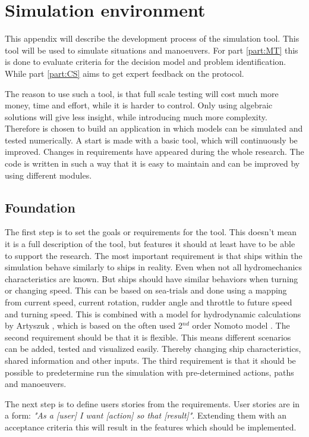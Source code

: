 \chapter{Simulation environment}
\label{app:tool}
This appendix will describe the development process of the simulation tool. This tool will be used to simulate situations and manoeuvers. For part \ref{part:MT} this is done to evaluate criteria for the decision model and problem identification. While part \ref{part:CS} aims to get expert feedback on the protocol.

The reason to use such a tool, is that full scale testing will cost much more money, time and effort, while it is harder to control. Only using algebraic solutions will give less insight, while introducing much more complexity. Therefore is chosen to build an application in which models can be simulated and tested numerically.
A start is made with a basic tool, which will continuously be improved. Changes in requirements have appeared during the whole research. The code is written in such a way that it is easy to maintain and can be improved by using different modules.

\section{Foundation}
The first step is to set the goals or requirements for the tool. This doesn't mean it is a full description of the tool, but features it should at least have to be able to support the research.
The most important requirement is that ships within the simulation behave similarly to ships in reality. Even when not all hydromechanics characteristics are known. But ships should have similar behaviors when turning or changing speed. This can be based on sea-trials and done using a mapping from current speed, current rotation, rudder angle and throttle to future speed and turning speed. This is combined with a model for hydrodynamic calculations by Artyszuk \cite{Artyszuk2016}, which is based on the often used 2$^{nd}$ order Nomoto model \cite{Nomoto1957}.
The second requirement should be that it is flexible. This means different scenarios can be added, tested and visualized easily. Thereby changing ship characteristics, shared information and other inputs.
The third requirement is that it should be possible to predetermine run the simulation with pre-determined actions, paths and manoeuvers.

The next step is to define users stories from the requirements. User stories are in a form: \emph{"As a [user] I want [action] so that [result]"}. Extending them with an acceptance criteria this will result in the features which should be implemented.

